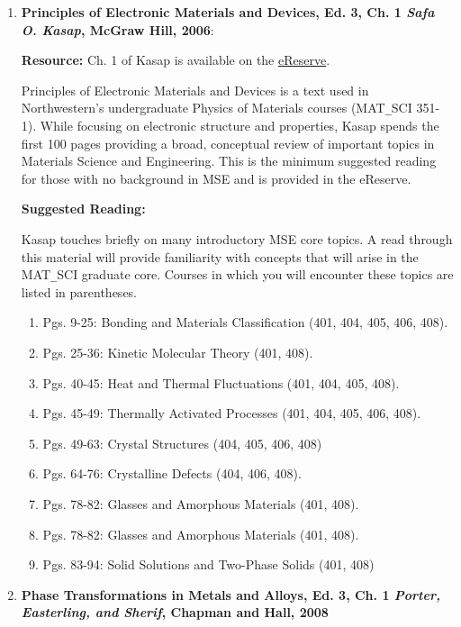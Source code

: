 \begin{enumerate}
\item \large \textbf{Principles of Electronic Materials and Devices, Ed. 3, Ch. 1\newline
	\textit{Safa O. Kasap}, McGraw Hill, 2006}:\normalsize
	
	\textbf{Resource:} Ch. 1 of Kasap is available on the \href{https://northwestern.box.com/s/13myp0an8snmmfjqfbx9gt1gbfrah0aj}{eReserve}.
	
	Principles of Electronic Materials and Devices is a text used in Northwestern's undergraduate Physics of Materials courses (MAT\texttt{\_}SCI 351-1). While focusing on electronic structure and properties, Kasap spends the first 100 pages providing a broad, conceptual review of important topics in Materials Science and Engineering. This is the minimum suggested reading for those with no background in MSE and is provided in the eReserve.
	
		\textbf{Suggested Reading:}
	
	Kasap touches briefly on many introductory MSE core topics. A read through this material will provide familiarity with concepts that will arise in the MAT\texttt{\_}SCI graduate core. Courses in which you will encounter these topics are listed in parentheses.
	
	\begin{enumerate}
		\item Pgs. 9-25: Bonding and Materials Classification (401, 404, 405, 406, 408).
		\item Pgs. 25-36: Kinetic Molecular Theory (401, 408).
		\item Pgs. 40-45: Heat and Thermal Fluctuations (401, 404, 405, 408).
		\item Pgs. 45-49: Thermally Activated Processes (401, 404, 405, 406, 408).
		\item Pgs. 49-63: Crystal Structures (404, 405, 406, 408)
		\item Pgs. 64-76: Crystalline Defects (404, 406, 408).
		\item Pgs. 78-82: Glasses and Amorphous Materials (401, 408).
		\item Pgs. 78-82: Glasses and Amorphous Materials (401, 408).
		\item Pgs. 83-94: Solid Solutions and Two-Phase Solids (401, 408)
	\end{enumerate}
	
	\item \large \textbf{Phase Transformations in Metals and Alloys, Ed. 3, Ch. 1 \newline
	\textit{Porter, Easterling, and Sherif}, Chapman and Hall, 2008}\normalsize
	

\end{enumerate}
